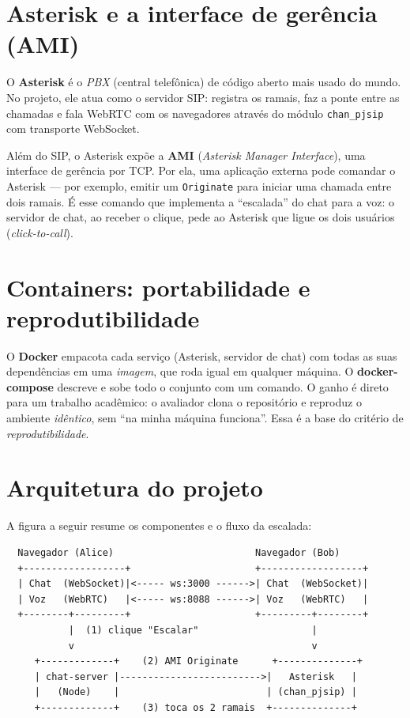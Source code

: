 \documentclass[11pt,a4paper]{article}
\begin{document}
\section{Asterisk e a interface de gerência (AMI)}

O \textbf{Asterisk} é o \emph{PBX} (central telefônica) de código aberto mais usado do mundo.
No projeto, ele atua como o servidor SIP: registra os ramais, faz a ponte entre as chamadas e
fala WebRTC com os navegadores através do módulo \verb|chan_pjsip| com transporte WebSocket.

Além do SIP, o Asterisk expõe a \textbf{AMI} (\emph{Asterisk Manager Interface}), uma interface
de gerência por TCP. Por ela, uma aplicação externa pode comandar o Asterisk --- por exemplo,
emitir um \verb|Originate| para iniciar uma chamada entre dois ramais. É esse comando que
implementa a ``escalada'' do chat para a voz: o servidor de chat, ao receber o clique, pede ao
Asterisk que ligue os dois usuários (\emph{click-to-call}).

\section{Containers: portabilidade e reprodutibilidade}

O \textbf{Docker} empacota cada serviço (Asterisk, servidor de chat) com todas as suas
dependências em uma \emph{imagem}, que roda igual em qualquer máquina. O
\textbf{docker-compose} descreve e sobe todo o conjunto com um comando. O ganho é direto para
um trabalho acadêmico: o avaliador clona o repositório e reproduz o ambiente \emph{idêntico},
sem ``na minha máquina funciona''. Essa é a base do critério de \emph{reprodutibilidade}.

\section{Arquitetura do projeto}

A figura a seguir resume os componentes e o fluxo da escalada:

\begin{lstlisting}
  Navegador (Alice)                         Navegador (Bob)
  +------------------+                      +------------------+
  | Chat  (WebSocket)|<----- ws:3000 ------>| Chat  (WebSocket)|
  | Voz   (WebRTC)   |<----- ws:8088 ------>| Voz   (WebRTC)   |
  +--------+---------+                      +---------+--------+
           |  (1) clique "Escalar"                    |
           v                                          v
     +-------------+    (2) AMI Originate      +--------------+
     | chat-server |------------------------->|   Asterisk   |
     |   (Node)    |                          | (chan_pjsip) |
     +-------------+    (3) toca os 2 ramais  +--------------+
\end{lstlisting}
\end{document}
